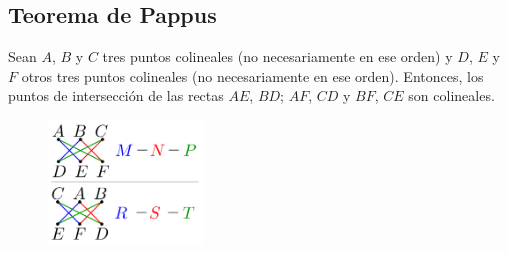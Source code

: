 \subsection{Teorema de Pappus}

\begin{section-theorem.tcb}
    Sean $A$, $B$ y $C$ tres puntos colineales (no necesariamente en ese orden) y $D$, $E$ y $F$ otros tres puntos colineales (no necesariamente en ese orden).
    Entonces, los puntos de intersección de las rectas $AE$, $BD$; $AF$, $CD$ y $BF$, $CE$ son colineales.
\end{section-theorem.tcb}

\begin{figure}[H]
    \centering
    \includegraphics[width=4.1cm]{images/pappus-points}
\end{figure}
\vspace{-15mm}
\begin{figure}[H]
    \centering
    
\end{figure}

